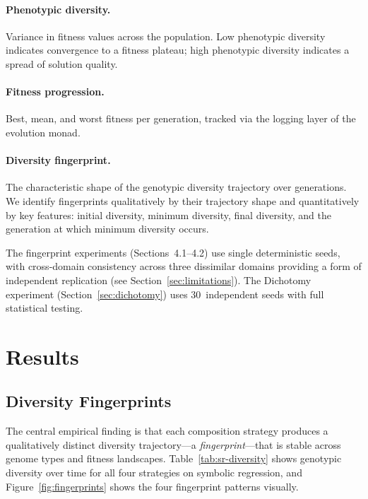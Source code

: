 \documentclass[sigconf,anonymous]{acmart}
\begin{document}
\paragraph{Phenotypic diversity.}
Variance in fitness values across the population. Low phenotypic diversity indicates convergence to a fitness plateau; high phenotypic diversity indicates a spread of solution quality.

\paragraph{Fitness progression.}
Best, mean, and worst fitness per generation, tracked via the logging layer of the evolution monad.

\paragraph{Diversity fingerprint.}
The characteristic shape of the genotypic diversity trajectory over generations. We identify fingerprints qualitatively by their trajectory shape and quantitatively by key features: initial diversity, minimum diversity, final diversity, and the generation at which minimum diversity occurs.

The fingerprint experiments (Sections~4.1--4.2) use single deterministic seeds, with cross-domain consistency across three dissimilar domains providing a form of independent replication (see Section~\ref{sec:limitations}). The Dichotomy experiment (Section~\ref{sec:dichotomy}) uses 30~independent seeds with full statistical testing.


\section{Results}

\subsection{Diversity Fingerprints}

The central empirical finding is that each composition strategy produces a qualitatively distinct diversity trajectory---a \emph{fingerprint}---that is stable across genome types and fitness landscapes. Table~\ref{tab:sr-diversity} shows genotypic diversity over time for all four strategies on symbolic regression, and Figure~\ref{fig:fingerprints} shows the four fingerprint patterns visually.
\end{document}
